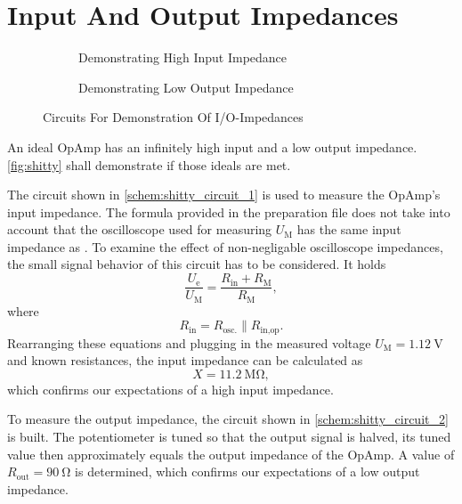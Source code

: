 \section{Input And Output Impedances}
\begin{figure}[tbp]
	\centering
	\begin{subfigure}{0.4\textwidth}
		\centering
		\caption{Demonstrating High Input Impedance}
		\label{schem:shitty_circuit_1}
	\end{subfigure}
	\begin{subfigure}{0.4\textwidth}
		\centering
		\caption{Demonstrating Low Output Impedance}
		\label{schem:shitty_circuit_2}
	\end{subfigure}
	\caption{Circuits For Demonstration Of I/O-Impedances}
	\label{fig:shitty}
\end{figure}
An ideal OpAmp has an infinitely high input and a low output impedance.
\autoref{fig:shitty} shall demonstrate if those ideals are met.

The circuit shown in \autoref{schem:shitty_circuit_1} is used to measure the OpAmp's input impedance.
The formula provided in the preparation file does not take into account that the oscilloscope used for measuring $U_\text{M}$ has the same input impedance as .
To examine the effect of non-negligable oscilloscope impedances, the small signal behavior of this circuit has to be considered.
It holds
\begin{equation*}
	\frac{U_\text{e}}{U_\text{M}}=\frac{R_\text{in}+R_\text{M}}{R_\text{M}},
\end{equation*}
where
\begin{equation*}
	R_\text{in}=R_\text{osc.}\| R_\text{in,op}.
\end{equation*}
Rearranging these equations and plugging in the measured voltage $U_\text{M}=\SI{1.12}{\volt}$ and known resistances, the input impedance can be calculated as
\begin{equation*}
	X=\SI{11.2}{\mega\ohm},
\end{equation*}
which confirms our expectations of a high input impedance.

To measure the output impedance, the circuit shown in \autoref{schem:shitty_circuit_2} is built.
The potentiometer is tuned so that the output signal is halved, its tuned value then approximately equals the output impedance of the OpAmp.
A value of $R_\text{out}=\SI{90}{\ohm}$ is determined, which confirms our expectations of a low output impedance.

